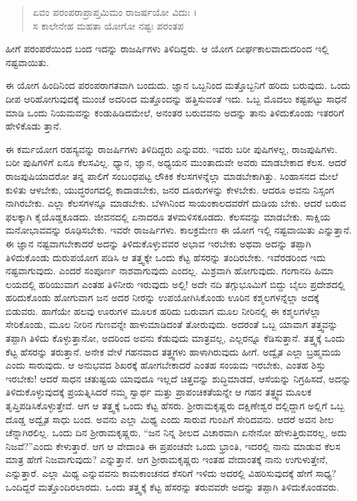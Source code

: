 \begin{verse}
ಏವಂ ಪರಂಪರಾಪ್ರಾಪ್ತಮಿಮಂ ರಾಜರ್ಷಯೋ ವಿದುಃ ।\\ಸ ಕಾಲೇನೇಹ ಮಹತಾ ಯೋಗೋ ನಷ್ಟಃ ಪರಂತಪ 
\end{verse}

{\small ಹೀಗೆ ಪರಂಪರೆಯಿಂದ ಬಂದ ಇದನ್ನು ರಾಜರ್ಷಿಗಳು ತಿಳಿದಿದ್ದರು. ಆ ಯೋಗ ದೀರ್ಘಕಾಲವಾದುದರಿಂದ ಇಲ್ಲಿ ನಷ್ಟವಾಯಿತು.}

ಈ ಯೋಗ ಹಿಂದಿನಿಂದ ಪರಂಪರಾಗತವಾಗಿ ಬಂದುದು. ಜ್ಞಾನ ಒಬ್ಬನಿಂದ ಮತ್ತೊಬ್ಬನಿಗೆ ಹರಿದು ಬರುವುದು. ಒಂದು ದೀಪ ಆರಿಹೋಗುವುದಕ್ಕೆ ಮುಂಚೆ ಅದರಿಂದ ಮತ್ತೊಂದನ್ನು ಹತ್ತಿಸುವಂತೆ ಇದು. ಒಬ್ಬ ಮೊದಲು ಕಷ್ಟಪಟ್ಟು ಸಾಧನೆ ಮಾಡಿ ಒಂದು ನಿಯಮವನ್ನು ಕಂಡುಹಿಡಿದಮೇಲೆ, ಅನಂತರ ಬರುವವನು ಅದನ್ನು ತಾನು ತಿಳಿದುಕೊಂಡು ಇತರರಿಗೆ ಹೇಳಿಕೊಡು ತ್ತಾನೆ.

ಈ ಕರ್ಮಯೋಗ ರಹಸ್ಯವನ್ನು ರಾಜರ್ಷಿಗಳು ತಿಳಿದಿದ್ದರು ಎನ್ನುವರು. ಇವರು ಬರೀ ಪುಷಿಗಳಲ್ಲ, ರಾಜಪುಷಿಗಳು. ಬರೀ ಪುಷಿಗಳಿಗೆ ಏನೂ ಕೆಲಸವಿಲ್ಲ. ಧ್ಯಾನ, ಜ್ಞಾನ, ಅಧ್ಯಯನ ಮುಂತಾದುವೇ ಅವರು ಮಾಡಬೇಕಾದ ಕೆಲಸ. ಆದರೆ ರಾಜಪುಷಿಯಾದರೋ ತನ್ನ ಪಾಲಿಗೆ ಸಂಬಂಧಪಟ್ಟ ಲೌಕಿಕ ಕೆಲಸಗಳನ್ನೆಲ್ಲಾ ಮಾಡಬೇಕಾಗಿತ್ತು. ಸಿಂಹಾಸನದ ಮೇಲೆ ಕುಳಿತು ಆಳಬೇಕು, ಯುದ್ಧರಂಗದಲ್ಲಿ ಕಾದಾಡಬೇಕು, ಜನರ ದೂರುಗಳನ್ನು ಕೇಳಬೇಕು. ಆದರೂ ಅವನು ನಿಸ್ಸಂಗ ನಾಗಿರಬೇಕು. ಎಲ್ಲಾ ಕೆಲಸಗಳನ್ನೂ ಮಾಡಬೇಕು. ಬೆಳಗಿನಿಂದ ಸಾಯಂಕಾಲದವರೆಗೆ ದುಡಿಯ ಬೇಕು. ಆದರೆ ಬರುವ ಫಲಕ್ಕಾಗಿ ಕೈಯೊಡ್ಡಕೂಡದು. ಜೀವನದಲ್ಲಿ ಏನಾದರೂ ತಳಮಳಿಸಕೂಡದು. ಕೆಲಸವನ್ನು ಮಾಡಬೇಕು. ಸಾಕ್ಷಿಯ ಮನೋಭಾವವನ್ನು ರೂಢಿಸಬೇಕು. ಇವರೇ ರಾಜರ್ಷಿಗಳು. ಕಾಲಕ್ರಮೇಣ ಈ ಯೋಗ ಇಲ್ಲಿ ನಷ್ಟವಾಯಿತು ಎನ್ನುತ್ತಾನೆ. ಈ ಜ್ಞಾನ ನಷ್ಟವಾಗಬೇಕಾದರೆ ಅದನ್ನು ತಿಳಿದುಕೊಳ್ಳುವವರ ಅಭಾವ ಇರಬೇಕು ಅಥವಾ ಅದನ್ನು ತಪ್ಪಾಗಿ ತಿಳಿದುಕೊಂಡು ದುರುಪಯೋಗ ಪಡಿಸಿ ಆ ತತ್ತ್ವಕ್ಕೇ ಒಂದು ಕೆಟ್ಟ ಹೆಸರನ್ನು ತಂದಿರಬೇಕು. ಇವೆರಡರಿಂದ ಇದು ನಷ್ಟವಾಗುವುದು. ಎಂದರೆ ಸಂಪೂರ್ಣ ನಾಶವಾಗುವುದು ಎಂದಲ್ಲ. ಮಿಶ್ರವಾಗಿ ಹೋಗುವುದು. ಗಂಗಾನದಿ ಹಿಮಾ ಲಯದಲ್ಲಿ ಹರಿಯುವಾಗ ಎಂತಹ ತಿಳಿನೀರು ಇರುವುದು ಅಲ್ಲಿ! ಅದೇ ನದಿ ತಗ್ಗುಭೂಮಿಗೆ ಬಿದ್ದು ಬೈಲು ಪ್ರದೇಶದಲ್ಲಿ ಹರಿದುಕೊಂಡು ಹೋಗುವಾಗ ಜನ ಅದರ ನೀರನ್ನು ಉಪಯೋಗಿಸಿಕೊಂಡು ಊರಿನ ಕಶ್ಮಲಗಳನ್ನೆಲ್ಲಾ ಅದಕ್ಕೆ ಬಿಡುವರು. ಹಾಗೆಯೇ ಹಲವು ಊರುಗಳ ಮೂಲಕ ಹರಿದು ಬರುವಾಗ ಮೂಲ ನೀರಿನಲ್ಲಿ ಈ ಕಶ್ಮಲಗಳೆಲ್ಲಾ ಸೇರಿಕೊಂಡು, ಮೂಲ ನೀರಿನ ಗುಣವನ್ನೇ ಹಾಳುಮಾಡಿದಂತೆ ತೋರುವುದು. ಅದರಂತೆ ಒಬ್ಬ ಯಾವಾಗ ತತ್ತ್ವವನ್ನು ತಪ್ಪಾಗಿ ತಿಳಿದು ಕೊಳ್ಳುತ್ತಾನೋ, ಅದರಿಂದ ಅವನು ಕೆಡುವುದು ಮಾತ್ರವಲ್ಲ, ಎಲ್ಲರನ್ನೂ ಕೆಡಿಸುತ್ತಾನೆ. ತತ್ತ್ವಕ್ಕೆ ಒಂದು ಕೆಟ್ಟ ಹೆಸರನ್ನು ತರುತ್ತಾನೆ. ಅನೇಕ ವೇಳೆ ಗಹನವಾದ ತತ್ತ್ವಗಳು ಹಾಳಾಗಿರುವುದು ಹೀಗೆ. ಅದ್ವೈತ ಎಲ್ಲಾ ಬ್ರಹ್ಮಮಯ ಎಂದು ಸಾರುವುದು. ಆ ಅನುಭವದ ಶಿಖರಕ್ಕೆ ಹೋಗಬೇಕಾದರೆ ಎಂತಹ ಸಂಯಮ ಇರಬೇಕು, ಎಂತಹ ಶಿಸ್ತು ಇರಬೇಕು! ಆದರೆ ಸಾಧನ ಚತುಷ್ಟಯ ಯಾವುದೂ ಇಲ್ಲದೆ ಚಿತ್ತವನ್ನು ಶುದ್ಧಿಮಾಡದೆ, ಆಸೆಯನ್ನು ನಿಗ್ರಹಿಸದೆ, ಅದನ್ನು ತಿಳಿದುಕೊಳ್ಳುವುದಕ್ಕೆ ಪ್ರಯತ್ನಿಸಿದರೆ ನಮ್ಮ ಸ್ವಾರ್ಥ ಮತ್ತು ಪ್ರಾಪಂಚಿಕತೆಯನ್ನೇ ಆ ಗಹನ ತತ್ತ್ವದ ಮೂಲಕ ತೃಪ್ತಿಪಡಿಸಿಕೊಳ್ಳುತ್ತೇವೆ. ಆಗ ಆ ತತ್ತ್ವಕ್ಕೆ ಒಂದು ಕೆಟ್ಟ ಹೆಸರು. ಶ್ರೀರಾಮಕೃಷ್ಣರು ದಕ್ಷಿಣೇಶ್ವರ ದಲ್ಲಿದ್ದಾಗ ಅಲ್ಲಿಗೆ ಒಬ್ಬ ದೊಡ್ಡ ಅದ್ವೈತ ಸಾಧು ಬಂದ. ಅವನು ಎಲ್ಲಾ ಮಿಥ್ಯ ಎಂದು ಸಾರುವ ಗುಂಪಿಗೆ ಸೇರಿದವನು. ಆದರೆ ಅವನ ಶೀಲ ಚೆನ್ನಾಗಿರಲಿಲ್ಲ. ಒಂದು ದಿನ ಶ್ರೀರಾಮಕೃಷ್ಣರು, “ಜನ ನಿನ್ನ ಶೀಲದ ವಿಚಾರವಾಗಿ ಏನೇನೋ ಹೇಳುತ್ತಿರುವರಲ್ಲ, ಅದು ನಿಜವೆ?”ಎಂದು ಕೇಳುತ್ತಾರೆ. ಆಗ ಆ ವೇದಾಂತಿ ಈ ಪ್ರಪಂಚವೇ ಒಂದು ಭ್ರಾಂತಿ, ಇದರಲ್ಲಿ ನಾನು ಮಾಡುವ ಕೆಲಸ ಮಾತ್ರ ಹೇಗೆ ನಿಜವಾಗುವುದು? ಎನ್ನುತ್ತಾನೆ. ಆಗ ಶ್ರೀರಾಮಕೃಷ್ಣರು ಇಂತಹ ವೇದಾಂತಕ್ಕೆ ನಾನು ಉಗುಳುತ್ತೇನೆ, ಎನ್ನುತ್ತಾರೆ. ಎಲ್ಲಾ ಮಿಥ್ಯ ಎನ್ನುವವನು ಕಾಮಕಾಂಚನದ ಕೆಸರಿಗೆ ಇಳಿದು ಅದರಲ್ಲಿ ವಿಹರಿಸುವುದಕ್ಕೆ ಹೇಗೆ ಸಾಧ್ಯ? ಒಂದಿದ್ದರೆ ಮತ್ತೊಂದಿರಲಾರದು. ಒಂದು ತತ್ತ್ವಕ್ಕೆ ಕೆಟ್ಟ ಹೆಸರನ್ನು ತರುವವರೇ ಅದನ್ನು ತಪ್ಪಾಗಿ ತಿಳಿದುಕೊಂಡವರು.

